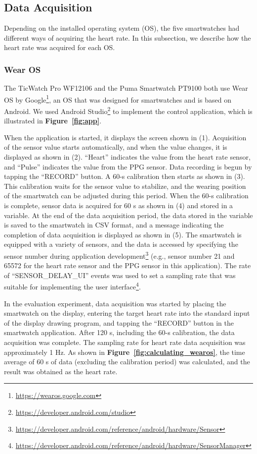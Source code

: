 \documentclass[manuscript,screen,review]{acmart}
\newcommand\figref[1]{\textbf{Figure~\ref{fig:#1}}}
\begin{document}
\subsection{Data Acquisition}
Depending on the installed operating system (OS), the five smartwatches had different ways of acquiring the heart rate. In this subsection, we describe how the heart rate was acquired for each OS.

\subsubsection{Wear OS}
The TicWatch Pro WF12106 and the Puma Smartwatch PT9100 both use Wear OS by Google\footnote{\url{https://wearos.google.com}}, an OS that was designed for smartwatches and is based on Android. We used Android Studio\footnote{\url{https://developer.android.com/studio}} to implement the control application, which is illustrated in \figref{app}.\par

When the application is started, it displays the screen shown in (1). Acquisition of the sensor value starts automatically, and when the value changes, it is displayed as shown in (2). ``Heart'' indicates the value from the heart rate sensor, and ``Pulse'' indicates the value from the PPG sensor. Data recording is begun by tapping the ``RECORD'' button. A 60-s calibration then starts as shown in (3). This calibration waits for the sensor value to stabilize, and the wearing position of the smartwatch can be adjusted during this period. When the 60-s calibration is complete, sensor data is acquired for 60 s as shown in (4) and stored in a variable. At the end of the data acquisition period, the data stored in the variable is saved to the smartwatch in CSV format, and a message indicating the completion of data acquisition is displayed as shown in (5). The smartwatch is equipped with a variety of sensors, and the data is accessed by specifying the sensor number during application development\footnote{\url{https://developer.android.com/reference/android/hardware/Sensor}} (e.g., sensor number 21 and 65572 for the heart rate sensor and the PPG sensor in this application). The rate of ``SENSOR\_DELAY\_UI'' events was used to set a sampling rate that was suitable for implementing the user interface\footnote{\url{https://developer.android.com/reference/android/hardware/SensorManager}}.\par

In the evaluation experiment, data acquisition was started by placing the smartwatch on the display, entering the target heart rate into the standard input of the display drawing program, and tapping the ``RECORD'' button in the smartwatch application. After 120 s, including the 60-s calibration, the data acquisition was complete. The sampling rate for heart rate data acquisition was approximately 1 Hz. As shown in \figref{calculating_wearos}, the time average of 60 s of data (excluding the calibration period) was calculated, and the result was obtained as the heart rate.
\end{document}
